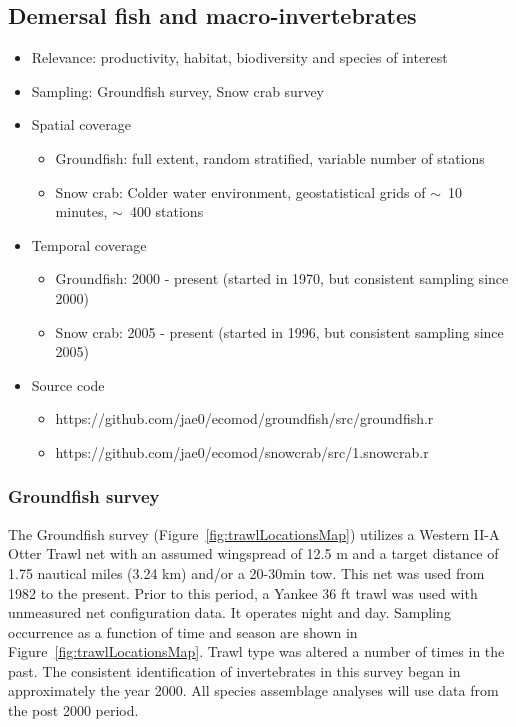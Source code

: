 \documentclass[letterpaper,portrait,11pt]{scrartcl}
\numberwithin{equation}{section}		%
\numberwithin{figure}{section}		%
\numberwithin{table}{section}				%
\begin{document}
\subsection{Demersal fish and macro-invertebrates}
\begin{itemize}
  \item Relevance:  productivity, habitat, biodiversity and species of interest
  \item Sampling:  Groundfish survey, Snow crab survey 
  \item Spatial coverage
    \begin{itemize}
      \item Groundfish: full extent, random stratified, variable number of stations
      \item Snow crab: Colder water environment, geostatistical grids of $\sim$~10 minutes, $\sim$~400 stations 
    \end{itemize}
  \item Temporal coverage
    \begin{itemize}
      \item Groundfish: 2000 - present (started in 1970, but consistent sampling since 2000)
      \item Snow crab: 2005 - present (started in 1996, but consistent sampling since 2005)
    \end{itemize}

  \item Source code
      \begin{itemize}
        \item https://github.com/jae0/ecomod/groundfish/src/groundfish.r
        \item https://github.com/jae0/ecomod/snowcrab/src/1.snowcrab.r
      \end{itemize}
  
\end{itemize}


\subsubsection{Groundfish survey}
\label{sec:groundfishSurvey}
The Groundfish survey (Figure~\ref{fig:trawlLocationsMap}) utilizes a Western II-A Otter Trawl net with an assumed wingspread of 12.5 m and a target distance of 1.75 nautical miles (3.24 km) and/or a 20-30min tow. This net was used from 1982 to the present. Prior to this period, a Yankee 36 ft trawl was used with unmeasured net configuration data. It operates night and day. Sampling occurrence as a function of time and season are shown in Figure~\ref{fig:trawlLocationsMap}. Trawl type was altered a number of times in the past. The consistent identification of invertebrates in this survey began in approximately the year 2000. All species assemblage analyses will use data from the post 2000 period.
\end{document}
